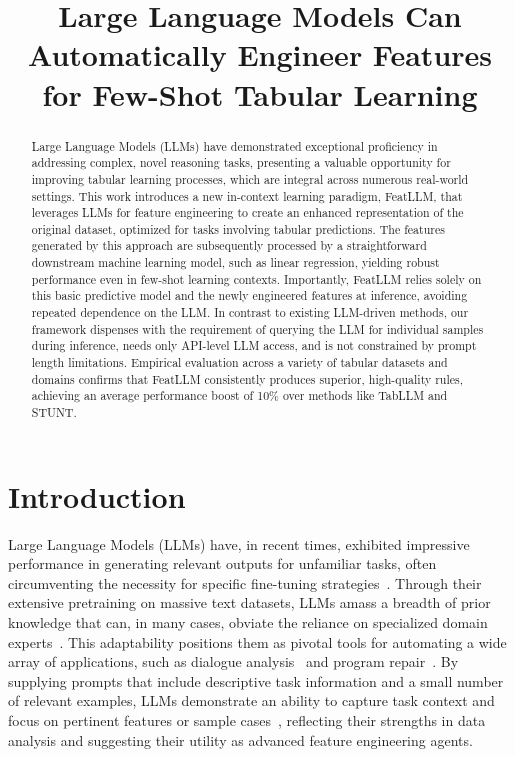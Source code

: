 \title{Large Language Models Can Automatically Engineer Features for Few-Shot Tabular Learning}

\begin{abstract}
Large Language Models (LLMs) have demonstrated exceptional proficiency in addressing complex, novel reasoning tasks, presenting a valuable opportunity for improving tabular learning processes, which are integral across numerous real-world settings. This work introduces a new in-context learning paradigm, \textsf{FeatLLM}, that leverages LLMs for feature engineering to create an enhanced representation of the original dataset, optimized for tasks involving tabular predictions. The features generated by this approach are subsequently processed by a straightforward downstream machine learning model, such as linear regression, yielding robust performance even in few-shot learning contexts. Importantly, \textsf{FeatLLM} relies solely on this basic predictive model and the newly engineered features at inference, avoiding repeated dependence on the LLM. In contrast to existing LLM-driven methods, our framework dispenses with the requirement of querying the LLM for individual samples during inference, needs only API-level LLM access, and is not constrained by prompt length limitations. Empirical evaluation across a variety of tabular datasets and domains confirms that \textsf{FeatLLM} consistently produces superior, high-quality rules, achieving an average performance boost of 10\% over methods like TabLLM and STUNT.
\end{abstract}

\section{Introduction}
Large Language Models (LLMs) have, in recent times, exhibited impressive performance in generating relevant outputs for unfamiliar tasks, often circumventing the necessity for specific fine-tuning strategies~\cite{creswell2022selection,imani2023mathprompter,taylor2022galactica}. Through their extensive pretraining on massive text datasets, LLMs amass a breadth of prior knowledge that can, in many cases, obviate the reliance on specialized domain experts~\cite{Genomes2021,singhal2023large,wilcox2003role}. This adaptability positions them as pivotal tools for automating a wide array of applications, such as dialogue analysis~\cite{finch2023leveraging} and program repair~\cite{fan2023automated}. By supplying prompts that include descriptive task information and a small number of relevant examples, LLMs demonstrate an ability to capture task context and focus on pertinent features or sample cases~\cite{brown2020language,zhao2023survey}, reflecting their strengths in data analysis and suggesting their utility as advanced feature engineering agents.

